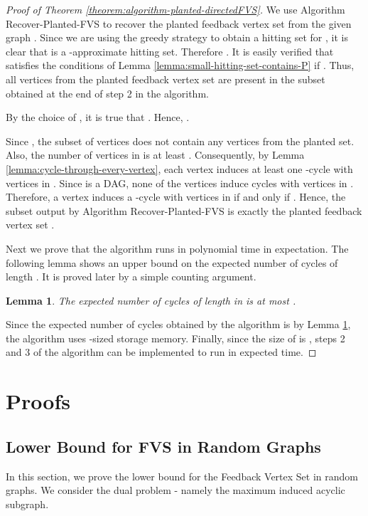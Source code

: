 \documentclass[11pt]{article}
\newtheorem{lemma}[theorem]{Lemma}
\begin{document}
\begin{proof}[Proof of Theorem \ref{theorem:algorithm-planted-directedFVS}]
We use Algorithm Recover-Planted-FVS to recover the planted feedback vertex set from the given graph . Since we are using the greedy strategy to obtain a hitting set  for , it is clear that  is a -approximate hitting set. Therefore . It is easily verified that  satisfies the conditions of Lemma \ref{lemma:small-hitting-set-contains-P} if . Thus, all vertices from the planted feedback vertex set  are present in the subset  obtained at the end of step 2 in the algorithm.

By the choice of , it is true that . Hence, .

Since , the subset of vertices  does not contain any vertices from the planted set. Also, the number of vertices in  is at least . Consequently, by Lemma \ref{lemma:cycle-through-every-vertex}, each vertex  induces at least one -cycle with vertices in . Since  is a DAG, none of the vertices  induce cycles with vertices in . Therefore, a vertex  induces a -cycle with vertices in  if and only if . Hence, the subset  output by Algorithm Recover-Planted-FVS is exactly the planted feedback vertex set .

Next we prove that the algorithm runs in polynomial time in expectation. The following lemma shows an upper bound on the expected number of cycles of length . It is proved later by a simple counting argument.

\begin{lemma}\label{lemma:expected-no-of-cycles}
The expected number of cycles of length  in  is at most .
\end{lemma}
Since the expected number of cycles obtained by the algorithm is  by Lemma \ref{lemma:expected-no-of-cycles}, the algorithm uses -sized storage memory. Finally, since the size of  is , steps 2 and 3 of the algorithm can be implemented to run in expected  time.
\end{proof}

\section{Proofs}
\subsection{Lower Bound for FVS in Random Graphs}
In this section, we prove the lower bound for the Feedback Vertex Set in random graphs. We consider the dual problem - namely the maximum induced acyclic subgraph.
\end{document}
